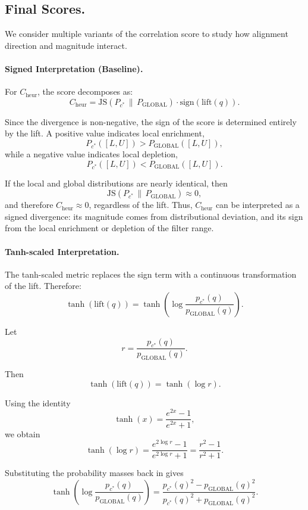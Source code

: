 \subsection{Final Scores.}\label{subsec:final-scores}

We consider multiple variants of the correlation score to study how alignment direction and magnitude interact.

\paragraph{Signed Interpretation (Baseline).}
For $C_{\mathrm{heur}}$, the score decomposes as:
\[
C_{\mathrm{heur}}
=
\mathrm{JS}(P_{c^*} \,\|\, P_{\mathrm{GLOBAL}})
\cdot
\mathrm{sign}(\mathrm{lift}(q)).
\]

Since the divergence is non-negative, the sign of the score is determined entirely by the lift.
A positive value indicates local enrichment,
\[
P_{c^*}([L,U]) > P_{\mathrm{GLOBAL}}([L,U]),
\]
while a negative value indicates local depletion,
\[
P_{c^*}([L,U]) < P_{\mathrm{GLOBAL}}([L,U]).
\]

If the local and global distributions are nearly identical, then
\[
\mathrm{JS}(P_{c^*} \,\|\, P_{\mathrm{GLOBAL}}) \approx 0,
\]
and therefore $C_{\mathrm{heur}} \approx 0$, regardless of the lift.
Thus, $C_{\mathrm{heur}}$ can be interpreted as a signed divergence: its magnitude comes from distributional deviation, and its sign from the local enrichment or depletion of the filter range.

\paragraph{Tanh-scaled Interpretation.}
The tanh-scaled metric replaces the sign term with a continuous transformation of the lift. Therefore:
\[
\tanh(\mathrm{lift}(q))
=
\tanh\left(
\log \frac{p_{c^*}(q)}{p_{\mathrm{GLOBAL}}(q)}
\right).
\]

Let
\[
r =
\frac{p_{c^*}(q)}{p_{\mathrm{GLOBAL}}(q)}.
\]

Then
\[
\tanh(\mathrm{lift}(q))
=
\tanh(\log r).
\]

Using the identity
\[
\tanh(x)
=
\frac{e^{2x}-1}{e^{2x}+1},
\]
we obtain
\[
\tanh(\log r)
=
\frac{e^{2\log r}-1}{e^{2\log r}+1}
=
\frac{r^2-1}{r^2+1}.
\]

Substituting the probability masses back in gives
\[
\tanh\left(
\log \frac{p_{c^*}(q)}{p_{\mathrm{GLOBAL}}(q)}
\right)
=
\frac{
p_{c^*}(q)^2 - p_{\mathrm{GLOBAL}}(q)^2
}{
p_{c^*}(q)^2 + p_{\mathrm{GLOBAL}}(q)^2
}.
\]

